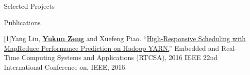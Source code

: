 \documentclass{resume} %
\begin{document}
\begin{rSection}{Selected Projects}




\end{rSection}


\begin{rSection}{Publications}

{[1]Yang Liu, }\underline{\bf Yukun Zeng}{ and Xuefeng Piao. ``\href{http://ieeexplore.ieee.org/document/7579961/}{High-Responsive Scheduling with MapReduce Performance Prediction on Hadoop YARN.}'' Embedded and Real-Time Computing Systems and Applications (RTCSA), 2016 IEEE 22nd International Conference on. IEEE, 2016.
}

\end{rSection}
\end{document}
